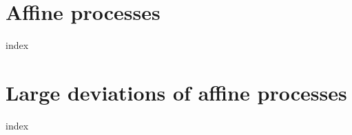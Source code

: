 \chapter{Affine processes}
\label{affine-processes}
{index}

\chapter{Large deviations of affine processes}
\label{large-deviations}
{index}
